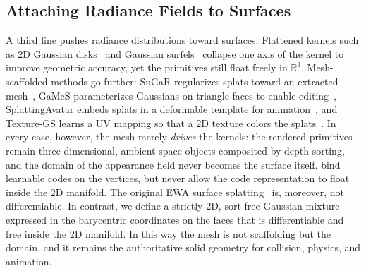\subsection{Attaching Radiance Fields to Surfaces}
A third line pushes radiance distributions toward surfaces.
Flattened kernels such as 2D Gaussian disks~\citep{2DGS} and Gaussian surfels~\citep{gaussianSurfels}
collapse one axis of the kernel to improve geometric accuracy, yet the primitives still float freely in $\mathbb{R}^3$. Mesh-scaffolded methods go further: SuGaR regularizes splats toward an extracted mesh~\citep{sugar},
GaMeS parameterizes Gaussians on triangle faces to enable editing~\citep{games},
SplattingAvatar embeds splats in a deformable template for animation~\citep{splattingAvatar},
and Texture-GS learns a UV mapping so that a 2D texture colors the splats~\citep{textureGS}.
In every case, however, the mesh merely \emph{drives} the kernels:
the rendered primitives remain three-dimensional, ambient-space objects composited by depth sorting,
and the domain of the appearance field never becomes the surface itself.
\citet{neumesh} bind learnable codes on the vertices, but never allow the code representation to float inside the 2D manifold.
The original EWA surface splatting~\citep{EWA} is, moreover, not differentiable.
In contrast, we define a strictly 2D, sort-free Gaussian mixture expressed in the barycentric coordinates on  the faces that is differentiable and free inside the 2D manifold.
In this way the mesh is not scaffolding but the domain, and it remains the authoritative solid geometry for collision, physics, and animation.


